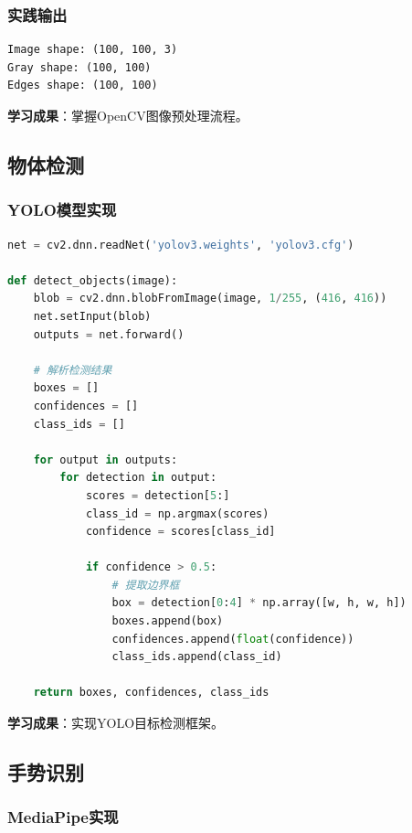 \documentclass[12pt,a4paper]{article}
\begin{document}
\subsubsection{实践输出}

\begin{verbatim}
Image shape: (100, 100, 3)
Gray shape: (100, 100)
Edges shape: (100, 100)
\end{verbatim}

\textbf{学习成果}：掌握OpenCV图像预处理流程。

\subsection{物体检测}

\subsubsection{YOLO模型实现}

\begin{lstlisting}[language=Python]
net = cv2.dnn.readNet('yolov3.weights', 'yolov3.cfg')

def detect_objects(image):
    blob = cv2.dnn.blobFromImage(image, 1/255, (416, 416))
    net.setInput(blob)
    outputs = net.forward()
    
    # 解析检测结果
    boxes = []
    confidences = []
    class_ids = []
    
    for output in outputs:
        for detection in output:
            scores = detection[5:]
            class_id = np.argmax(scores)
            confidence = scores[class_id]
            
            if confidence > 0.5:
                # 提取边界框
                box = detection[0:4] * np.array([w, h, w, h])
                boxes.append(box)
                confidences.append(float(confidence))
                class_ids.append(class_id)
    
    return boxes, confidences, class_ids
\end{lstlisting}

\textbf{学习成果}：实现YOLO目标检测框架。

\subsection{手势识别}

\subsubsection{MediaPipe实现}
\end{document}
